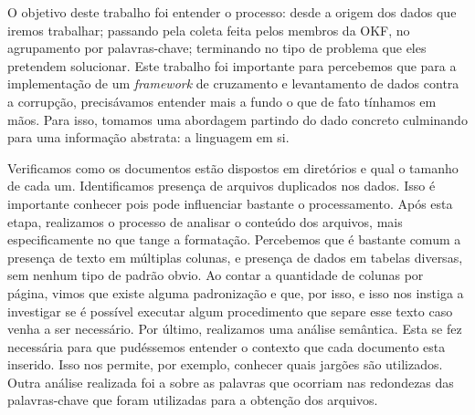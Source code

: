 \documentclass[10pt, a4paper]{article}
\begin{document}




O objetivo deste trabalho foi entender o processo: desde a origem dos dados que iremos trabalhar; passando pela coleta feita pelos membros da OKF, no agrupamento por palavras-chave; terminando no tipo de problema que eles pretendem solucionar. Este trabalho foi importante para percebemos que para a implementação de um \textit{framework} de cruzamento e levantamento de dados contra a corrupção, precisávamos entender mais a fundo o que de fato tínhamos em mãos. Para isso, tomamos uma abordagem partindo do dado concreto culminando para uma informação abstrata: a linguagem em si.

Verificamos como os documentos estão dispostos em diretórios e qual o tamanho de cada um. Identificamos presença de arquivos duplicados nos dados. Isso é importante conhecer pois pode influenciar bastante o processamento. 
Após esta etapa, realizamos o processo de analisar o conteúdo dos arquivos, mais especificamente no que tange a formatação. Percebemos que é bastante comum a presença de texto em múltiplas colunas, e presença de dados em tabelas diversas, sem nenhum tipo de padrão obvio. 
Ao contar a quantidade de colunas por página, vimos que existe alguma padronização e que, por isso, e isso nos instiga a investigar se é possível executar algum procedimento que separe esse texto caso venha a ser necessário. Por último, realizamos uma análise semântica. Esta se fez necessária para que pudéssemos entender o contexto que cada documento esta inserido. Isso nos permite, por exemplo, conhecer quais jargões são utilizados. Outra análise realizada foi a sobre as palavras que ocorriam nas redondezas das palavras-chave que foram utilizadas para a obtenção dos arquivos.

\end{document}
